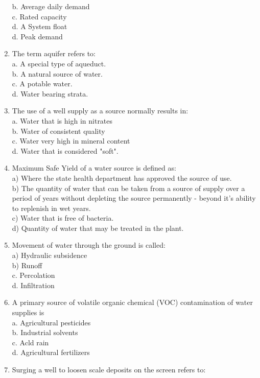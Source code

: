 \begin{enumerate}
b. Average daily demand\\
c. Rated capacity\\
d. A System float\\
d. Peak demand\\
\item The term aquifer refers to:\\
a. A special type of aqueduct.\\
b. A natural source of water.\\
c. A potable water.\\
d. Water bearing strata.\\
\item The use of a well supply as a source normally results in:\\
a. Water that is high in nitrates\\
b. Water of consistent quality\\
c. Water very high in mineral content\\
d. Water that is considered "soft".\\
\item Maximum Safe Yield of a water source is defined as:\\
a) Where the state health department has approved the source of use.\\
b) The quantity of water that can be taken from a source of supply over a period of years without depleting the source permanently - beyond it's ability to replenish in wet years.\\
c) Water that is free of bacteria.\\
d) Quantity of water that may be treated in the plant.\\
\item Movement of water through the ground is called:\\
a) Hydraulic subsidence\\
b) Runoff\\
c. Percolation\\
d. Infiltration\\
\item A primary source of volatile organic chemical (VOC) contamination of water supplies is\\
a. Agricultural pesticides\\
b. Industrial solvents\\
c. Acld rain\\
d. Agricultural fertilizers\\
\item Surging a well to loosen scale deposits on the screen refers to:\\

\end{enumerate}
